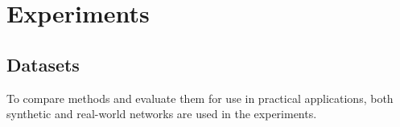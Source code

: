 \documentclass[\main/thesis.tex]{subfiles}
\begin{document}

\section{Experiments}
\subsection{Datasets}
To compare methods and evaluate them for use in practical applications, both synthetic and real-world networks are used in the experiments.
\end{document}
